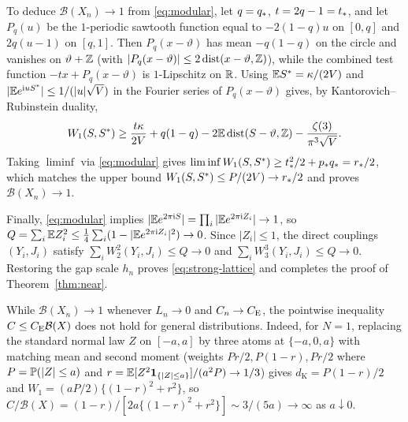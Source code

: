 To deduce $\mathcal B(X_n)\to1$ from \eqref{eq:modular}, let $q=q_*$,
$t=2q-1=t_*$, and let $P_q(u)$ be the $1$-periodic sawtooth function equal to
$-2(1-q)u$ on $[0,q]$ and $2q(u-1)$ on $[q,1]$. Then $P_q(x-\vartheta)$ has
mean $-q(1-q)$ on the circle and vanishes on $\vartheta+\mathbb Z$ (with
$|P_q(x-\vartheta)|\le2\operatorname{dist}(x-\vartheta,\mathbb Z)$), while the combined test
function $-tx+P_q(x-\vartheta)$ is $1$-Lipschitz on $\mathbb R$. Using
$\mathbb E S^*=\kappa/(2V)$ and $|\mathbb E e^{\mathrm i uS^*}|\le1/(|u|\sqrt V)$ in the Fourier
series of $P_q(x-\vartheta)$ gives, by Kantorovich--Rubinstein duality,
\begin{equation}\label{eq:modular-dual}
 W_1(S,S^*)\ge\frac{t\kappa}{2V}+q(1-q)
  -2\mathbb E\operatorname{dist}(S-\vartheta,\mathbb Z)-\frac{\zeta(3)}{\pi^3\sqrt V}.
\end{equation}
Taking $\liminf$ via \eqref{eq:modular} gives
$\liminf W_1(S,S^*)\ge t_*^2/2+p_*q_*=r_*/2$, which matches the upper bound
$W_1(S,S^*)\le P/(2V)\to r_*/2$ and proves $\mathcal B(X_n)\to1$.

Finally, \eqref{eq:modular} implies $|\mathbb E e^{2\pi\mathrm i S}|=\prod_i|\mathbb E e^{2\pi\mathrm i Z_i}|\to1$,
so $Q=\sum_i\mathbb E Z_i^2\le\frac14\sum_i(1-|\mathbb E e^{2\pi\mathrm i Z_i}|^2)\to0$. Since
$|Z_i|\le1$, the direct couplings $(Y_i,J_i)$ satisfy
$\sum_i W_2^2(Y_i,J_i)\le Q\to0$ and $\sum_i W_3^3(Y_i,J_i)\le Q\to0$.
Restoring the gap scale $h_n$ proves \eqref{eq:strong-lattice} and completes
the proof of Theorem~\ref{thm:near}.

\begin{remark}
While $\mathcal B(X_n)\to1$ whenever $L_n\to0$ and $C_n\to C_{\mathrm E}$, the pointwise
inequality $C\le C_{\mathrm E}\mathcal B(X)$ does not hold for general distributions.
Indeed, for $N=1$, replacing the standard normal law $Z$ on $[-a,a]$ by three
atoms at $\{-a,0,a\}$ with matching mean and second moment (weights
$Pr/2,P(1-r),Pr/2$ where $P=\mathbb P(|Z|\le a)$ and $r=\mathbb E[Z^2\mathbf1_{\{|Z|\le a\}}]/(a^2P)\to1/3$)
gives $d_{\mathrm K}=P(1-r)/2$ and $W_1=(aP/2)\{(1-r)^2+r^2\}$, so
$C/\mathcal B(X)=(1-r)/[2a\{(1-r)^2+r^2\}]\sim3/(5a)\to\infty$ as $a\downarrow0$.
\end{remark}
